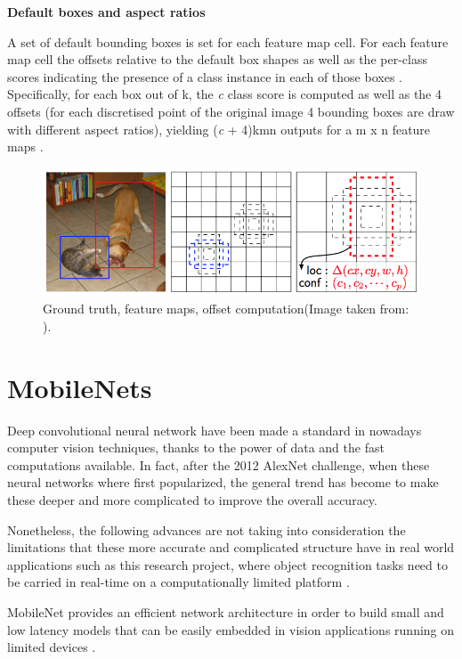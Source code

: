 \textbf{Default boxes and aspect ratios}

A set of default bounding boxes is set for each feature map cell. For each feature map cell the offsets relative to the default box shapes as well as the per-class scores indicating the presence of a class instance in each of those boxes \cite{paper:SSD}. Specifically, for each box out of k, the \textit{c} class score is computed as well as the 4 offsets (for each discretised point of the original image 4 bounding boxes are draw with different aspect ratios), yielding (\textit{c} + 4)kmn outputs for a m x n feature maps \cite{paper:SSD}.

\begin{figure}[!htbp]
\begin{center}
\includegraphics[width=\linewidth]{images/gt_boxes.png}
\end{center}
\caption{Ground truth, feature maps, offset computation(Image taken from: \cite{paper:SSD}).}
\label{fig:ssdGT}
\end{figure}

\section{MobileNets}

Deep convolutional neural network have been made a standard in nowadays computer vision techniques, thanks to the power of data and the fast computations available. In fact, after the 2012 AlexNet challenge, when these neural networks where first popularized, the general trend has become to make these deeper and more complicated \cite{paper:MobileNets} to improve the overall accuracy.

Nonetheless, the following advances are not taking into consideration the limitations that these more accurate and complicated structure have in real world applications such as this research project, where object recognition tasks need to be carried in real-time on a computationally limited platform \cite{paper:MobileNets}.

MobileNet provides an efficient network architecture in order to build small and low latency models that can be easily embedded in vision applications running on limited devices \cite{paper:MobileNets}.

